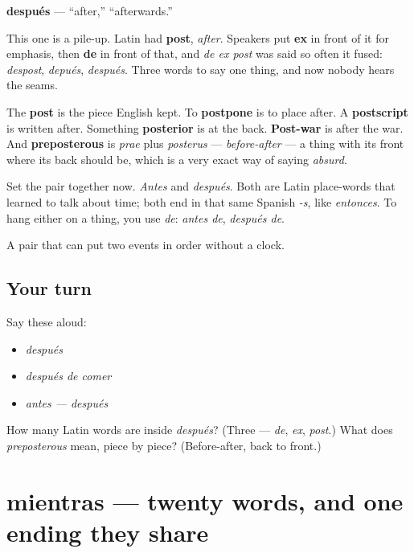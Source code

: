\begin{cousinweb}
\textbf{después} — \textquotedblleft{}after,\textquotedblright{} \textquotedblleft{}afterwards.\textquotedblright{}

This one is a pile-up. Latin had \textbf{post}, \emph{after}. Speakers put \textbf{ex} in front of it for emphasis, then \textbf{de} in front of that, and \emph{de ex post} was said so often it fused: \emph{despost}, \emph{depués}, \emph{después}. Three words to say one thing, and now nobody hears the seams.

The \textbf{post} is the piece English kept. To \textbf{postpone} is to place after. A \textbf{postscript} is written after. Something \textbf{posterior} is at the back. \textbf{Post-war} is after the war. And \textbf{preposterous} is \emph{prae} plus \emph{posterus} — \emph{before-after} — a thing with its front where its back should be, which is a very exact way of saying \emph{absurd}.

Set the pair together now. \emph{Antes} and \emph{después}. Both are Latin place-words that learned to talk about time; both end in that same Spanish \emph{-s}, like \emph{entonces}. To hang either on a thing, you use \emph{de}: \emph{antes de}, \emph{después de}.
\end{cousinweb}

\begin{grammarlens}[title={What you've built}]
A pair that can put two events in order without a clock.
\end{grammarlens}

\subsection*{Your turn}
Say these aloud:

\begin{itemize}
\raggedright
  \item \emph{después}
  \item \emph{después de comer}
  \item \emph{antes — después}
\end{itemize}

\begin{tcolorbox}[breakable,colback=teal!4,colframe=teal!35!black,title={Before you move on}]
How many Latin words are inside \emph{después}? (Three — \emph{de}, \emph{ex}, \emph{post}.) What does \emph{preposterous} mean, piece by piece? (Before-after, back to front.)
\end{tcolorbox}
\section[mientras]{mientras — twenty words, and one ending they share}


